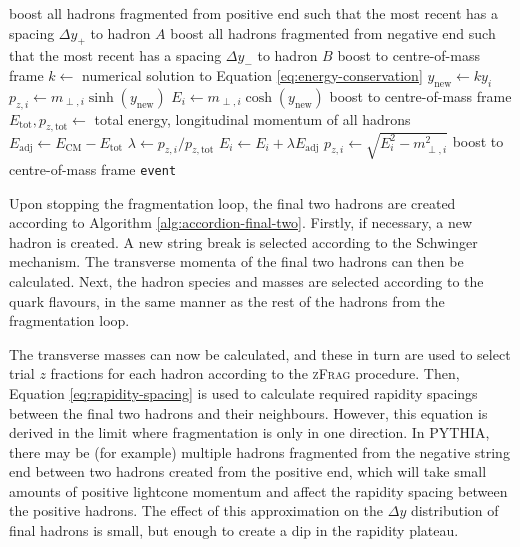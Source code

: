 \documentclass[12pt,a4paper]{report}
\begin{document}
\begin{algorithm}
\begin{algorithmic}
      \State boost all hadrons fragmented from positive end such that the most recent has a spacing $\Delta y_+$ to hadron $A$
      \State boost all hadrons fragmented from negative end such that the most recent has a spacing $\Delta y_-$ to hadron $B$
      \State boost to centre-of-mass frame
      \State $k \gets$ numerical solution to Equation \eqref{eq:energy-conservation}
      \Repeat
          \State $y_\text{new} \gets k y_i$
          \State $p_{z,i} \gets m_{\perp,i} \sinh(y_\text{new})$
          \State $E_i \gets m_{\perp,i} \cosh(y_\text{new})$
        \EndFor
      \State boost to centre-of-mass frame
      \Repeat
        \State $E_\text{tot}, p_{z,\text{tot}} \gets$ total energy, longitudinal momentum of all hadrons
        \State $E_\text{adj} \gets E_\text{CM} - E_\text{tot}$
          \State $\lambda \gets p_{z,i} / p_{z,\text{tot}}$
          \State $E_i \gets E_i + \lambda E_\text{adj}$
          \State $p_{z,i} \gets \sqrt{E_i^2 - m_{\perp,i}^2}$
        \EndFor
        \State boost to centre-of-mass frame
      \State \Return \texttt{event}
    \EndProcedure
  \end{algorithmic}
\end{algorithm}

Upon stopping the fragmentation loop, the final two hadrons are created according to Algorithm \ref{alg:accordion-final-two}. Firstly, if necessary, a new hadron is created. A new string break is selected according to the Schwinger mechanism. The transverse momenta of the final two hadrons can then be calculated. Next, the hadron species and masses are selected according to the quark flavours, in the same manner as the rest of the hadrons from the fragmentation loop.

The transverse masses can now be calculated, and these in turn are used to select trial $z$ fractions for each hadron according to the \textsc{zFrag} procedure. Then, Equation \eqref{eq:rapidity-spacing} is used to calculate required rapidity spacings between the final two hadrons and their neighbours. However, this equation is derived in the limit where fragmentation is only in one direction. In PYTHIA, there may be (for example) multiple hadrons fragmented from the negative string end between two hadrons created from the positive end, which will take small amounts of positive lightcone momentum and affect the rapidity spacing between the positive hadrons. The effect of this approximation on the $\Delta y$ distribution of final hadrons is small, but enough to create a dip in the rapidity plateau.
\end{document}
